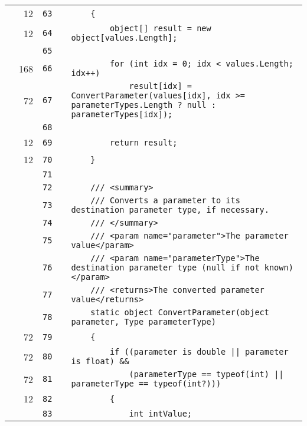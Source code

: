 \documentclass[a4paper,landscape,10pt]{article}
\begin{document}
\begin{longtable}[l]{lrrll}
\cellcolor{green} & 12 & \verb~63~ & & \verb~    {~\\
\cellcolor{green} & 12 & \verb~64~ & & \verb~        object[] result = new object[values.Length];~\\
\cellcolor{gray} &  & \verb~65~ & & \verb~~\\
\cellcolor{green} & 168 & \verb~66~ & & \verb~        for (int idx = 0; idx < values.Length; idx++)~\\
\cellcolor{orange} & 72 & \verb~67~ & & \verb~            result[idx] = ConvertParameter(values[idx], idx >= parameterTypes.Length ? null : parameterTypes[idx]);~\\
\cellcolor{gray} &  & \verb~68~ & & \verb~~\\
\cellcolor{green} & 12 & \verb~69~ & & \verb~        return result;~\\
\cellcolor{green} & 12 & \verb~70~ & & \verb~    }~\\
\cellcolor{gray} &  & \verb~71~ & & \verb~~\\
\cellcolor{gray} &  & \verb~72~ & & \verb~    /// <summary>~\\
\cellcolor{gray} &  & \verb~73~ & & \verb~    /// Converts a parameter to its destination parameter type, if necessary.~\\
\cellcolor{gray} &  & \verb~74~ & & \verb~    /// </summary>~\\
\cellcolor{gray} &  & \verb~75~ & & \verb~    /// <param name="parameter">The parameter value</param>~\\
\cellcolor{gray} &  & \verb~76~ & & \verb~    /// <param name="parameterType">The destination parameter type (null if not known)</param>~\\
\cellcolor{gray} &  & \verb~77~ & & \verb~    /// <returns>The converted parameter value</returns>~\\
\cellcolor{gray} &  & \verb~78~ & & \verb~    static object ConvertParameter(object parameter, Type parameterType)~\\
\cellcolor{green} & 72 & \verb~79~ & & \verb~    {~\\
\cellcolor{orange} & 72 & \verb~80~ & & \verb~        if ((parameter is double || parameter is float) &&~\\
\cellcolor{green} & 72 & \verb~81~ & & \verb~            (parameterType == typeof(int) || parameterType == typeof(int?)))~\\
\cellcolor{green} & 12 & \verb~82~ & & \verb~        {~\\
\cellcolor{gray} &  & \verb~83~ & & \verb~            int intValue;~\\

\end{longtable}
\end{document}
